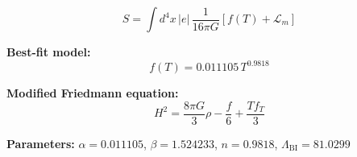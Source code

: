 
\begin{equation}
  S = \int d^4x \, |e| \, \frac{1}{16\pi G} \left[ f(T) + \mathcal{L}_m \right]
\end{equation}

\textbf{Best-fit model:}
\begin{equation}
  f(T) = 0.011105 \, T^{0.9818}
\end{equation}

\textbf{Modified Friedmann equation:}
\begin{equation}
  H^2 = \frac{8\pi G}{3} \rho - \frac{f}{6} + \frac{T f_T}{3}
\end{equation}

\textbf{Parameters:}
$\alpha = 0.011105$, \quad
$\beta = 1.524233$, \quad
$n = 0.9818$, \quad
$\Lambda_{\text{BI}} = 81.0299$